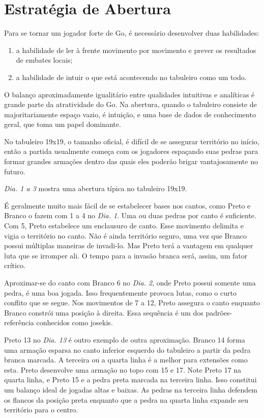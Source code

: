 \chapter{Estratégia de Abertura}

Para se tornar um jogador forte de Go, é necessário desenvolver duas habilidades:

\begin{enumerate}
    \item a habilidade de ler à frente movimento por movimento e prever os resultados de embates locais;
    \item a habilidade de intuir o que está acontecendo no tabuleiro como um todo.
\end{enumerate}

O balanço aproximadamente igualitário entre qualidades intuitivas e analíticas é grande parte da atratividade do Go. Na abertura, quando o tabuleiro consiste de majoritariamente espaço vazio, é intuição, e uma base de dados de conhecimento geral, que toma um papel dominante.

No tabuleiro 19x19, o tamanho oficial, é difícil de se assegurar território no início, então a partida usualmente começa com os jogadores espaçando suas pedras para formar grandes armações dentro das quais eles poderão brigar vantajosamente no futuro.

\emph{Dia. 1 a 3} mostra uma abertura típica no tabuleiro 19x19.

É geralmente muito mais fácil de se estabelecer bases nos cantos, como Preto e Branco o fazem com 1 a 4 no \emph{Dia. 1}. Uma ou duas pedras por canto é suficiente. Com 5, Preto estabelece um enclausuro de canto. Esse movimento delimita e vigia o território no canto. Não é ainda território seguro, uma vez que Branco possui múltiplas maneiras de invadi-lo. Mas Preto terá a vantagem em qualquer luta que se irromper ali. O tempo para a invasão branca será, assim, um fator crítico.

Aproximar-se do canto com Branco 6 no \emph{Dia. 2}, onde Preto possui somente uma pedra, é uma boa jogada. Isso frequentemente provoca lutas, como o curto conflito que se segue. Nos movimentos de 7 a 12, Preto assegura  o canto enquanto Branco constrói uma posição à direita. Essa sequência é um dos padrões-referência conhecidos como josekis.

Preto 13 no \emph{Dia. 13} é outro exemplo de outra aproximação. Branco 14 forma uma armação esparsa no canto inferior esquerdo do tabuleiro a partir da pedra branca marcada. A terceira ou a quarta linha é a melhor para extensões como esta. Preto desenvolve uma armação no topo com 15 e 17. Note Preto 17 na quarta linha, e Preto 15 e a pedra preta marcada na terceira linha. Isso constitui um balanço ideal de jogadas altas e baixas. As pedras na terceira linha defendem os flancos da posição preta enquanto que a pedra na quarta linha expande seu território para o centro.

